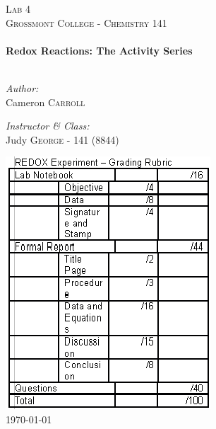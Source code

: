 \begin{titlepage}
\begin{center}

\textsc{\Large Lab 4}\\[1.5cm]
\textsc{\Large Grossmont College - Chemistry 141}\\[0.5cm]

\HRule \\[0.4cm]
{ \LARGE \bfseries Redox Reactions: The Activity Series}\\[0.5cm]

\HRule \\[1.5cm]

\begin{minipage}{0.4\textwidth}
\begin{flushleft} \large
\emph{Author:}\\
Cameron \textsc{Carroll}
\end{flushleft}
\end{minipage}
\begin{minipage}{0.4\textwidth}
\begin{flushright} \large
\emph{Instructor \& Class:}\\
Judy \textsc{George} - 141 (8844)
\end{flushright}
\end{minipage}

\vfill

\includegraphics{./redox_rxn_rubric.png}\\[1cm]

{\large \today}

\end{center}
\end{titlepage}
